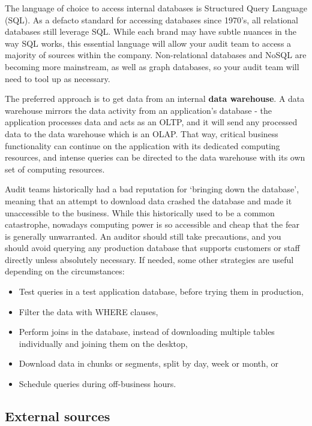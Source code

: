 \documentclass[
]{book}
\providecommand{\tightlist}{%
  \setlength{\itemsep}{0pt}\setlength{\parskip}{0pt}}
\begin{document}
The language of choice to access internal databases is Structured Query Language (SQL). As a defacto standard for accessing databases since 1970's, all relational databases still leverage SQL. While each brand may have subtle nuances in the way SQL works, this essential language will allow your audit team to access a majority of sources within the company. Non-relational databases and NoSQL are becoming more mainstream, as well as graph databases, so your audit team will need to tool up as necessary.

The preferred approach is to get data from an internal \textbf{data warehouse}. A data warehouse mirrors the data activity from an application's database - the application processes data and acts as an OLTP, and it will send any processed data to the data warehouse which is an OLAP. That way, critical business functionality can continue on the application with its dedicated computing resources, and intense queries can be directed to the data warehouse with its own set of computing resources.

Audit teams historically had a bad reputation for `bringing down the database', meaning that an attempt to download data crashed the database and made it unaccessible to the business. While this historically used to be a common catastrophe, nowadays computing power is so accessible and cheap that the fear is generally unwarranted. An auditor should still take precautions, and you should avoid querying any production database that supports customers or staff directly unless absolutely necessary. If needed, some other strategies are useful depending on the circumstances:

\begin{itemize}
\tightlist
\item
  Test queries in a test application database, before trying them in production,
\item
  Filter the data with WHERE clauses,
\item
  Perform joins in the database, instead of downloading multiple tables individually and joining them on the desktop,
\item
  Download data in chunks or segments, split by day, week or month, or
\item
  Schedule queries during off-business hours.
\end{itemize}

\hypertarget{external-sources}{%
\subsection{External sources}\label{external-sources}}
\end{document}
